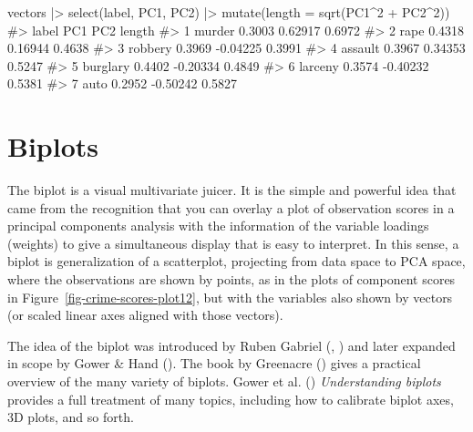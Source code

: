\documentclass[
  letterpaper,
  10pt,
  krantz2]{krantz}
\makeatletter
\newenvironment{Shaded}{\begin{snugshade}}{\end{snugshade}}
\newcommand{\AttributeTok}[1]{\textcolor[rgb]{0.40,0.45,0.13}{#1}}
\newcommand{\CommentTok}[1]{\textcolor[rgb]{0.37,0.37,0.37}{#1}}
\newcommand{\DecValTok}[1]{\textcolor[rgb]{0.68,0.00,0.00}{#1}}
\newcommand{\FunctionTok}[1]{\textcolor[rgb]{0.28,0.35,0.67}{#1}}
\newcommand{\NormalTok}[1]{\textcolor[rgb]{0.00,0.23,0.31}{#1}}
\newcommand{\SpecialCharTok}[1]{\textcolor[rgb]{0.37,0.37,0.37}{#1}}
\newenvironment{kframe}{%
  \medskip{}
  \setlength{\fboxsep}{.8em}
  \def\at@end@of@kframe{}%
  \ifinner\ifhmode%
  \def\at@end@of@kframe{\end{minipage}}%
  \begin{minipage}{\columnwidth}%
  \fi\fi%
  \def\FrameCommand##1{\hskip\@totalleftmargin \hskip-\fboxsep
  \colorbox{shadecolor}{##1}\hskip-\fboxsep
      \hskip-\linewidth \hskip-\@totalleftmargin \hskip\columnwidth}%
  \MakeFramed {\advance\hsize-\width
    \@totalleftmargin\z@ \linewidth\hsize
    \@setminipage}}%
{\par\unskip\endMakeFramed%
  \at@end@of@kframe}
\renewenvironment{Shaded}{\begin{kframe}}{\end{kframe}}
\makeatother
\begin{document}
\begin{Shaded}
\begin{Highlighting}[]
\NormalTok{vectors }\SpecialCharTok{|\textgreater{}} \FunctionTok{select}\NormalTok{(label, PC1, PC2) }\SpecialCharTok{|\textgreater{}} 
  \FunctionTok{mutate}\NormalTok{(}\AttributeTok{length =} \FunctionTok{sqrt}\NormalTok{(PC1}\SpecialCharTok{\^{}}\DecValTok{2} \SpecialCharTok{+}\NormalTok{ PC2}\SpecialCharTok{\^{}}\DecValTok{2}\NormalTok{))}
\CommentTok{\#\textgreater{}      label    PC1      PC2 length}
\CommentTok{\#\textgreater{} 1   murder 0.3003  0.62917 0.6972}
\CommentTok{\#\textgreater{} 2     rape 0.4318  0.16944 0.4638}
\CommentTok{\#\textgreater{} 3  robbery 0.3969 {-}0.04225 0.3991}
\CommentTok{\#\textgreater{} 4  assault 0.3967  0.34353 0.5247}
\CommentTok{\#\textgreater{} 5 burglary 0.4402 {-}0.20334 0.4849}
\CommentTok{\#\textgreater{} 6  larceny 0.3574 {-}0.40232 0.5381}
\CommentTok{\#\textgreater{} 7     auto 0.2952 {-}0.50242 0.5827}
\end{Highlighting}
\end{Shaded}

\section{Biplots}\label{sec-biplot}

The biplot is a visual multivariate juicer. It is the simple and
powerful idea that came from the recognition that you can overlay a plot
of observation scores in a principal components analysis with the
information of the variable loadings (weights) to give a simultaneous
display that is easy to interpret. In this sense, a biplot is
generalization of a scatterplot, projecting from data space to PCA
space, where the observations are shown by points, as in the plots of
component scores in Figure~\ref{fig-crime-scores-plot12}, but with the
variables also shown by vectors (or scaled linear axes aligned with
those vectors).

The idea of the biplot was introduced by Ruben Gabriel
(, ) and
later expanded in scope by Gower \& Hand
(). The book by Greenacre
() gives a practical overview
of the many variety of biplots. Gower et al.
() \emph{Understanding biplots}
provides a full treatment of many topics, including how to calibrate
biplot axes, 3D plots, and so forth.
\end{document}
